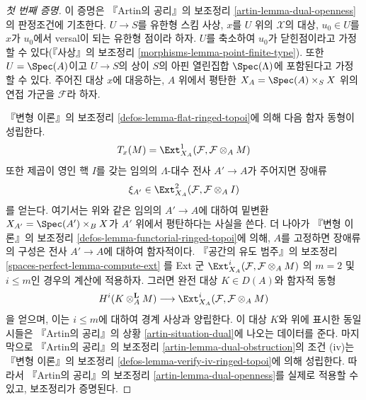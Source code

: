\begin{proof}[첫 번째 증명]
이 증명은 『Artin의 공리』의 보조정리
\ref{artin-lemma-dual-openness}의 판정조건에 기초한다.
$U \to S$를 유한형 스킴 사상, $x$를 $U$ 위의
$\mathcal{X}$의 대상, $u_0 \in U$를 $x$가 $u_0$에서 versal이 되는
유한형 점이라 하자. $U$를 축소하여 $u_0$가 닫힌점이라고
가정할 수 있다(『사상』의 보조정리 \ref{morphisms-lemma-point-finite-type}).
또한 $U = \Spec(A)$이고 $U \to S$의 상이 $S$의 아핀 열린집합
$\Spec(\Lambda)$에 포함된다고 가정할 수 있다.
주어진 대상 $x$에 대응하는, $A$ 위에서 평탄한
$X_A = \Spec(A) \times_S X$ 위의 연접 가군을 $\mathcal{F}$라 하자.

\medskip\noindent
『변형 이론』의 보조정리 \ref{defos-lemma-flat-ringed-topoi}에 의해
다음 함자 동형이 성립한다.
$$
T_x(M) = \Ext^1_{X_A}(\mathcal{F}, \mathcal{F} \otimes_A M)
$$
또한 제곱이 영인 핵 $I$를 갖는 임의의 $\Lambda$-대수 전사
$A' \to A$가 주어지면 장애류
$$
\xi_{A'} \in \Ext^2_{X_A}(\mathcal{F}, \mathcal{F} \otimes_A I)
$$
를 얻는다. 여기서는 위와 같은 임의의 $A' \to A$에 대하여 밑변환
$X_{A'} = \Spec(A') \times_B X$가 $A'$ 위에서 평탄하다는 사실을 쓴다.
더 나아가 『변형 이론』의 보조정리
\ref{defos-lemma-functorial-ringed-topoi}에 의해, $A$를 고정하면
장애류의 구성은 전사 $A' \to A$에 대하여 함자적이다.
『공간의 유도 범주』의 보조정리
\ref{spaces-perfect-lemma-compute-ext}
를 Ext 군
$\Ext^i_{X_A}(\mathcal{F}, \mathcal{F} \otimes_A M)$
의 $m = 2$ 및 $i \leq m$인 경우의 계산에 적용하자. 그러면
완전 대상 $K \in D(A)$와 함자적 동형
$$
H^i(K \otimes_A^\mathbf{L} M)
\longrightarrow
\Ext^i_{X_A}(\mathcal{F}, \mathcal{F} \otimes_A M)
$$
을 얻으며, 이는 $i \leq m$에 대하여 경계 사상과 양립한다.
이 대상 $K$와 위에 표시한 동일시들은 『Artin의 공리』의 상황
\ref{artin-situation-dual}에 나오는 데이터를 준다.
마지막으로 『Artin의 공리』의 보조정리
\ref{artin-lemma-dual-obstruction}의 조건 (iv)는 『변형 이론』의 보조정리
\ref{defos-lemma-verify-iv-ringed-topoi}에 의해 성립한다.
따라서 『Artin의 공리』의 보조정리
\ref{artin-lemma-dual-openness}를 실제로 적용할 수 있고, 보조정리가 증명된다.
\end{proof}

